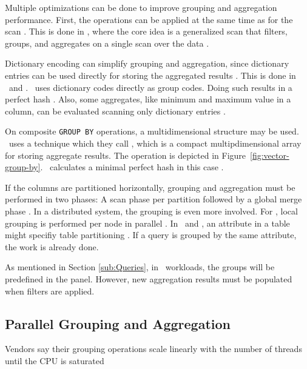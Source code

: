 Multiple optimizations can be done to improve grouping and aggregation performance. First, the operations can be applied at the same time as for the scan \cite{Lemke2010-is}. This is done in \blink, where the core idea is a generalized scan that filters, groups, and aggregates on a single scan over the data \cite{Raman2008-gi}.

Dictionary encoding can simplify grouping and aggregation, since dictionary entries can be used directly for storing the aggregated results \cite{Boncz2005-wj, Lemke2010-is}. This is done in \monetx~and \blink. \blink~uses dictionary codes directly as group codes. Doing such results in a perfect hash \cite{Raman2008-gi}. Also, some aggregates, like minimum and maximum value in a column, can be evaluated scanning only  dictionary entries \cite{Lemke2010-is}.

On composite \texttt{GROUP BY} operations, a multidimensional structure may be used. \oracle~uses a technique which they call , which is a compact multipdimensional array for storing aggregate results. The operation is depicted in Figure~\ref{fig:vector-group-by}. \blink~calculates a minimal perfect hash in this case \cite{Raman2008-gi}.

If the columns are partitioned horizontally, grouping and aggregation must be performed in two phases: A scan phase per partition followed by a global merge phase \cite{Lemke2010-is}. In a distributed system, the grouping is even more involved. For \ibm, local grouping is performed per node in parallel \cite{Raman2013-em}. In \exasol~and \oracle, an attribute in a table might specifiy table partitioning \cite{Exasol2014-xh, Lahiri2015-mz}. If a query is grouped by the same attribute, the work is already done.

As mentioned in Section \ref{sub:Queries}, in \bd~workloads, the groups will be predefined in the panel. However, new aggregation results must be populated when filters are applied.

\subsection{Parallel Grouping and Aggregation}
\label{sub:Parallel Grouping and Aggregation}
Vendors say their grouping operations scale linearly with the number of threads until the CPU is saturated \cite{Farber2012-vh}

